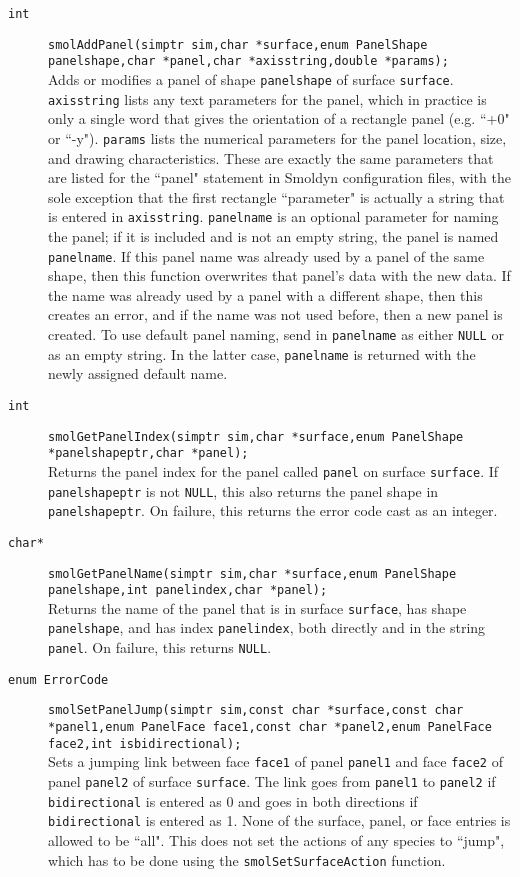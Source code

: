 \documentclass {book}
\begin{document}
\begin{description}
\item[\texttt{int}]
\texttt{smolAddPanel(simptr sim,char *surface,enum PanelShape panelshape,char *panel,char *axisstring,double *params);}
\hfill \\
Adds or modifies a panel of shape \texttt{panelshape} of surface \texttt{surface}. \texttt{axisstring} lists any text parameters for the panel, which in practice is only a single word that gives the orientation of a rectangle panel (e.g. ``+0" or ``-y"). \texttt{params} lists the numerical parameters for the panel location, size, and drawing characteristics. These are exactly the same parameters that are listed for the ``panel" statement in Smoldyn configuration files, with the sole exception that the first rectangle ``parameter" is actually a string that is entered in \texttt{axisstring}. \texttt{panelname} is an optional parameter for naming the panel; if it is included and is not an empty string, the panel is named \texttt{panelname}. If this panel name was already used by a panel of the same shape, then this function overwrites that panel's data with the new data. If the name was already used by a panel with a different shape, then this creates an error, and if the name was not used before, then a new panel is created. To use default panel naming, send in \texttt{panelname} as either \texttt{NULL} or as an empty string. In the latter case, \texttt{panelname} is returned with the newly assigned default name.

\item[\texttt{int}]
\texttt{smolGetPanelIndex(simptr sim,char *surface,enum PanelShape *panelshapeptr,char *panel);}
\hfill \\
Returns the panel index for the panel called \texttt{panel} on surface \texttt{surface}. If \texttt{panelshapeptr} is not \texttt{NULL}, this also returns the panel shape in \texttt{panelshapeptr}. On failure, this returns the error code cast as an integer.

\item[\texttt{char*}]
\texttt{smolGetPanelName(simptr sim,char *surface,enum PanelShape panelshape,int panelindex,char *panel);}
\hfill \\
Returns the name of the panel that is in surface \texttt{surface}, has shape \texttt{panelshape}, and has index \texttt{panelindex}, both directly and in the string \texttt{panel}. On failure, this returns \texttt{NULL}.

\item[\texttt{enum ErrorCode}]
\texttt{smolSetPanelJump(simptr sim,const char *surface,const char *panel1,enum PanelFace face1,const char *panel2,enum PanelFace face2,int isbidirectional);}
\hfill \\
Sets a jumping link between face \texttt{face1} of panel \texttt{panel1} and face \texttt{face2} of panel \texttt{panel2} of surface \texttt{surface}. The link goes from \texttt{panel1} to \texttt{panel2} if \texttt{bidirectional} is entered as 0 and goes in both directions if \texttt{bidirectional} is entered as 1. None of the surface, panel, or face entries is allowed to be ``all". This does not set the actions of any species to ``jump", which has to be done using the \texttt{smolSetSurfaceAction} function.


\end{description}
\end{document}
